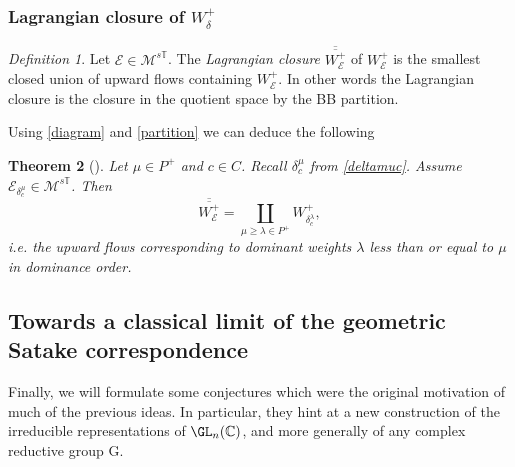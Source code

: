 \documentclass[12pt]{article}
\numberwithin{equation}{section}
\newtheorem{theorem}{Theorem}
\theoremstyle{remark}
\newtheorem{definition}[theorem]{Definition}
\numberwithin{theorem}{section}
\def\calE{{\mathcal E}}
\def\C{\mathbb{C}}
\def\M{{\mathcal{M}}}
\def\calH{\mathcal{H}}
\newcommand{\T}{{\mathbb{T}}}
\newcommand{\Gr}{\textnormal{Gr}}
\newcommand{\G}{\mathrm{G}}
\numberwithin{equation}{section}
\begin{document}




\subsubsection{Lagrangian closure of $W^+_\delta$}

\begin{definition} Let $\calE\in \M^{s\T}$. The {\em Lagrangian closure}  $\overline{\overline{W^+_\calE}}$ of 
	$W^+_\calE$ is the smallest closed union of upward flows containing $W^+_\calE$. In other words the Lagrangian closure is the closure in the quotient space by the BB partition. 
\end{definition}

Using \eqref{diagram} and \eqref{partition} we can deduce the following
\begin{theorem}[\cite{hausel-hitchin1}]  Let $\mu\in P^+$ and $c\in C$. Recall $\delta^\mu_c$ from \eqref{deltamuc}. Assume  $\calE_{\delta^\mu_c}\in \M^{s\T}$. Then 	 $$\overline{\overline{W^+_\calE}}=\coprod_{\mu\geq \lambda\in P^+} W^+_{\delta^\lambda_c},$$ i.e. the upward flows corresponding to dominant weights $\lambda$ less than or equal to $\mu$ in dominance order. 
\end{theorem}


\subsection{Towards a classical limit of the geometric Satake correspondence}
\label{geosat}
Finally, we will formulate some conjectures which were the original motivation of much of the previous ideas. In particular, they hint at a new construction of the irreducible representations of $\GL_n(\C)$, and  more generally of any complex reductive group $\G$. 
\end{document}
